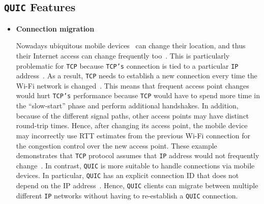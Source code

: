 \documentclass[12pt,a4paper,twoside,openright]{report}
\begin{document}
\subsection{\texttt{QUIC} Features} \label{QUIC_features}
\begin{itemize}


 \item \textbf{Connection migration} 
 
    Nowadays ubiquitous mobile devices~\cite{bib_number_of_mobile_users} can change their location, and thus their Internet access can change frequently too~\cite{PollardBarry2019HiAP}.
    This is particularly problematic for \texttt{TCP} because \texttt{TCP's} connection is tied to a particular \texttt{IP} address~\cite{PollardBarry2019HiAP}.
    As a result, \texttt{TCP} needs to establish a new connection every time the Wi-Fi network is changed~\cite{PollardBarry2019HiAP}.
    This means that frequent access point changes would hurt \texttt{TCP's} performance because \texttt{TCP} would have to spend more time in the \enquote{slow-start} phase and perform additional handshakes.
    In addition, because of the different signal paths, other access points may have distinct round-trip times.
    Hence, after changing its access point, the mobile device may incorrectly use RTT estimates from the previous Wi-Fi connection for the congestion control over the new access point.
    These example demonstrates that \texttt{TCP} protocol assumes that \texttt{IP} address would not frequently change~\cite{PollardBarry2019HiAP}.
    In contrast, \texttt{QUIC} is more suitable to handle connections via mobile devices.
    In particular, \texttt{QUIC} has an explicit connection ID that does not depend on the IP address~\cite{PollardBarry2019HiAP}.
    Hence, \texttt{QUIC} clients can migrate between multiple different \texttt{IP} networks without having to re-establish a \texttt{QUIC} connection.
    
    
    






\end{itemize}
\end{document}
